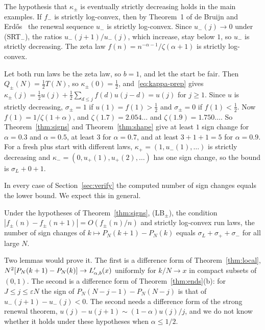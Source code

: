 The hypothesis that $\kappa_\pm$ is eventually strictly decreasing holds in the main
examples. If $f_\minus$ is strictly log-convex, then by Theorem~1 of de Bruijn and
Erd\H{o}s~\cite{debruijnerdos1953} the renewal sequence $u_\minus$ is strictly log-convex.
Since $u_\minus(j)\to0$ under (SRT$_\minus$), the ratios $u_\minus(j+1)/u_\minus(j)$, which
increase, stay below $1$, so $u_\minus$ is strictly decreasing. The zeta law
$f(n)=n^{-\alpha-1}/\zeta(\alpha+1)$ is strictly log-convex.

\begin{example}\label{ex:counts}
Let both run laws be the zeta law, so $b=1$, and let the start be fair. Then
$Q_\pm(N)=\frac12T(N)$, so $\kappa_\pm(0)=\frac12$, and~\eqref{eq:kappa-prep} gives
$\kappa_\pm(j)=\frac12u(j)+\frac12\sum_{d\le j}f(d)u(j-d)=u(j)$ for $j\ge1$. Since $u$ is
strictly decreasing, $\sigma_\pm=1$ if $u(1)=f(1)>\frac12$ and $\sigma_\pm=0$ if $f(1)<\frac12$.
Now $f(1)=1/\zeta(1+\alpha)$, and $\zeta(1.7)=2.054\ldots$ and $\zeta(1.9)=1.750\ldots$. So
Theorem~\ref{thm:signs} and Theorem~\ref{thm:shape} give at least $1$ sign change for
$\alpha=0.3$ and $\alpha=0.5$, at least $3$ for $\alpha=0.7$, and at least $3+1+1=5$ for
$\alpha=0.9$. For a fresh plus start with different laws, $\kappa_\plus=(1,u_\minus(1),\dots)$
is strictly decreasing and $\kappa_\minus=(0,u_\plus(1),u_\plus(2),\dots)$ has one sign
change, so the bound is $\sigma_L+0+1$.
\end{example}

In every case of Section~\ref{sec:verify} the computed number of sign changes equals the
lower bound. We expect this in general.

\begin{conjecture}\label{conj:count}
Under the hypotheses of Theorem~\ref{thm:signs}, (LB$_\pm$), the condition
$|f_\pm(n)-f_\pm(n+1)|=O(f_\pm(n)/n)$ and strictly log-convex run laws, the number of sign
changes of $k\mapsto P_N(k+1)-P_N(k)$ equals $\sigma_L+\sigma_\plus+\sigma_\minus$ for all
large $N$.
\end{conjecture}

Two lemmas would prove it. The first is a difference form of Theorem~\ref{thm:local},
$N^2[P_N(k+1)-P_N(k)]\to L_{\alpha,b}'(x)$ uniformly for $k/N\to x$ in compact subsets of $(0,1)$.
The second is a difference form of Theorem~\ref{thm:ends}(b): for $J\le j\le\varepsilon N$
the sign of $P_N(N-j-1)-P_N(N-j)$ is that of $u_\minus(j+1)-u_\minus(j)<0$. The second
needs a difference form of the strong renewal theorem,
$u(j)-u(j+1)\sim(1-\alpha)u(j)/j$, and we do not know whether it holds under these
hypotheses when $\alpha\le1/2$.
